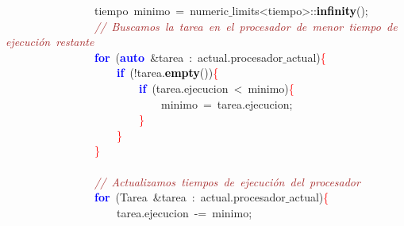 \mbox{}\ \ \ \ \ \ \ \ \ \ \ \ \ \ \ \ \textcolor{TealBlue}{tiempo}\ minimo\ \textcolor{BrickRed}{=}\ numeric$\_$limits\textcolor{BrickRed}{\textless{}}tiempo\textcolor{BrickRed}{\textgreater{}::}\textbf{\textcolor{Black}{infinity}}\textcolor{BrickRed}{();} \\
\mbox{}\ \ \ \ \ \ \ \ \ \ \ \ \ \ \ \ \textit{\textcolor{Brown}{//\ Buscamos\ la\ tarea\ en\ el\ procesador\ de\ menor\ tiempo\ de\ ejecución\ restante}} \\
\mbox{}\ \ \ \ \ \ \ \ \ \ \ \ \ \ \ \ \textbf{\textcolor{Blue}{for}}\ \textcolor{BrickRed}{(}\textbf{\textcolor{Blue}{auto}}\ \textcolor{BrickRed}{\&}tarea\ \textcolor{BrickRed}{:}\ actual\textcolor{BrickRed}{.}procesador$\_$actual\textcolor{BrickRed}{)}\textcolor{Red}{\{} \\
\mbox{}\ \ \ \ \ \ \ \ \ \ \ \ \ \ \ \ \ \ \ \ \textbf{\textcolor{Blue}{if}}\ \textcolor{BrickRed}{(!}tarea\textcolor{BrickRed}{.}\textbf{\textcolor{Black}{empty}}\textcolor{BrickRed}{())}\textcolor{Red}{\{} \\
\mbox{}\ \ \ \ \ \ \ \ \ \ \ \ \ \ \ \ \ \ \ \ \ \ \ \ \textbf{\textcolor{Blue}{if}}\ \textcolor{BrickRed}{(}tarea\textcolor{BrickRed}{.}ejecucion\ \textcolor{BrickRed}{\textless{}}\ minimo\textcolor{BrickRed}{)}\textcolor{Red}{\{} \\
\mbox{}\ \ \ \ \ \ \ \ \ \ \ \ \ \ \ \ \ \ \ \ \ \ \ \ \ \ \ \ minimo\ \textcolor{BrickRed}{=}\ tarea\textcolor{BrickRed}{.}ejecucion\textcolor{BrickRed}{;} \\
\mbox{}\ \ \ \ \ \ \ \ \ \ \ \ \ \ \ \ \ \ \ \ \ \ \ \ \textcolor{Red}{\}} \\
\mbox{}\ \ \ \ \ \ \ \ \ \ \ \ \ \ \ \ \ \ \ \ \textcolor{Red}{\}} \\
\mbox{}\ \ \ \ \ \ \ \ \ \ \ \ \ \ \ \ \textcolor{Red}{\}} \\
\mbox{} \\
\mbox{}\ \ \ \ \ \ \ \ \ \ \ \ \ \ \ \ \textit{\textcolor{Brown}{//\ Actualizamos\ tiempos\ de\ ejecución\ del\ procesador}} \\
\mbox{}\ \ \ \ \ \ \ \ \ \ \ \ \ \ \ \ \textbf{\textcolor{Blue}{for}}\ \textcolor{BrickRed}{(}\textcolor{TealBlue}{Tarea}\ \textcolor{BrickRed}{\&}tarea\ \textcolor{BrickRed}{:}\ actual\textcolor{BrickRed}{.}procesador$\_$actual\textcolor{BrickRed}{)}\textcolor{Red}{\{} \\
\mbox{}\ \ \ \ \ \ \ \ \ \ \ \ \ \ \ \ \ \ \ \ tarea\textcolor{BrickRed}{.}ejecucion\ \textcolor{BrickRed}{-=}\ minimo\textcolor{BrickRed}{;} \\
\mbox{} \\
